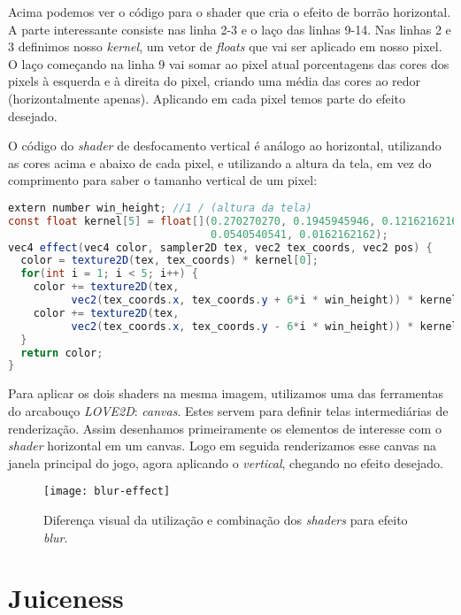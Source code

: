 Acima podemos ver o código para o shader que cria o efeito de borrão horizontal. A parte interessante consiste nas linha 2-3 e o laço das linhas 9-14. Nas linhas 2 e 3 definimos nosso \textit{kernel}, um vetor de \textit{floats} que vai ser aplicado em nosso pixel. O laço começando na linha 9 vai somar ao pixel atual porcentagens das cores dos pixels à esquerda e à direita do pixel, criando uma média das cores ao redor (horizontalmente apenas). Aplicando em cada pixel temos parte do efeito desejado.

O código do \textit{shader} de desfocamento vertical é análogo ao horizontal, utilizando as cores acima e abaixo de cada pixel, e utilizando a altura da tela, em vez do comprimento para saber o tamanho vertical de um pixel:

\begin{lstlisting}[language=java]
extern number win_height; //1 / (altura da tela)
const float kernel[5] = float[](0.270270270, 0.1945945946, 0.1216216216,
                                0.0540540541, 0.0162162162);
vec4 effect(vec4 color, sampler2D tex, vec2 tex_coords, vec2 pos) {
  color = texture2D(tex, tex_coords) * kernel[0];
  for(int i = 1; i < 5; i++) {
    color += texture2D(tex,
          vec2(tex_coords.x, tex_coords.y + 6*i * win_height)) * kernel[i];
    color += texture2D(tex,
          vec2(tex_coords.x, tex_coords.y - 6*i * win_height)) * kernel[i];
  }
  return color;
}
\end{lstlisting}

Para aplicar os dois shaders na mesma imagem, utilizamos uma das ferramentas do arcabouço \textit{LOVE2D}: \textit{canvas}. Estes servem para definir telas intermediárias de renderização. Assim desenhamos primeiramente os elementos de interesse com o \textit{shader} horizontal em um canvas. Logo em seguida renderizamos esse canvas na janela principal do jogo, agora aplicando o \textit{vertical}, chegando no efeito desejado.

\begin{figure}[h!]
\texttt{[image: blur-effect]}
\centering
\caption{Diferença visual da utilização e combinação dos \textit{shaders} para efeito \textit{blur}.}
\end{figure}


\section{Juiceness}
\label{sec:juiceness}

